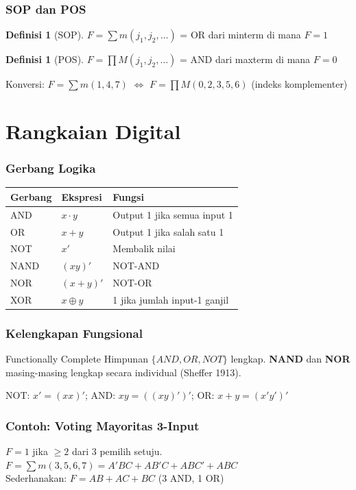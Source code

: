 \documentclass[handout]{beamer}
\theoremstyle{definition}
\newtheorem{definisi}[theorem]{Definisi}
\theoremstyle{example}
\begin{document}
\begin{frame}
\frametitle{SOP dan POS}
\begin{definisi}[SOP]
$F = \sum m(j_1, j_2, \ldots)$ = OR dari minterm di mana $F=1$
\end{definisi}
\begin{definisi}[POS]
$F = \prod M(j_1, j_2, \ldots)$ = AND dari maxterm di mana $F=0$
\end{definisi}
Konversi: $F = \sum m(1,4,7)$ $\Leftrightarrow$ $F = \prod M(0,2,3,5,6)$ (indeks komplementer)
\end{frame}

\section{Rangkaian Digital}

\begin{frame}
\frametitle{Gerbang Logika}
\begin{center}
\small
\begin{tabular}{|l|l|l|}
\hline
\textbf{Gerbang} & \textbf{Ekspresi} & \textbf{Fungsi} \\ \hline
AND & $x \cdot y$ & Output 1 jika semua input 1 \\ \hline
OR & $x + y$ & Output 1 jika salah satu 1 \\ \hline
NOT & $x'$ & Membalik nilai \\ \hline
NAND & $(xy)'$ & NOT-AND \\ \hline
NOR & $(x+y)'$ & NOT-OR \\ \hline
XOR & $x \oplus y$ & 1 jika jumlah input-1 ganjil \\ \hline
\end{tabular}
\end{center}
\end{frame}

\begin{frame}
\frametitle{Kelengkapan Fungsional}
\begin{block}{Functionally Complete}
Himpunan $\{AND, OR, NOT\}$ lengkap. \textbf{NAND} dan \textbf{NOR} masing-masing lengkap secara individual (Sheffer 1913).
\end{block}
NOT: $x' = (xx)'$; AND: $xy = ((xy)')'$; OR: $x+y = (x'y')'$
\end{frame}

\begin{frame}
\frametitle{Contoh: Voting Mayoritas 3-Input}
$F=1$ jika $\geq 2$ dari 3 pemilih setuju.\\
$F = \sum m(3,5,6,7) = A'BC + AB'C + ABC' + ABC$\\
Sederhanakan: $F = AB + AC + BC$ (3 AND, 1 OR)
\end{frame}
\end{document}
